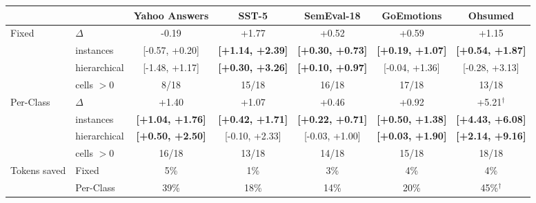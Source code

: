 \begin{tabular}{llccccc}
\toprule
 & & Yahoo Answers & SST-5 & SemEval-18 & GoEmotions & Ohsumed \\
\midrule
Fixed & $\Delta$ & -0.19 & +1.77 & +0.52 & +0.59 & +1.15 \\
 & instances & [-0.57, +0.20] & \textbf{[+1.14, +2.39]} & \textbf{[+0.30, +0.73]} & \textbf{[+0.19, +1.07]} & \textbf{[+0.54, +1.87]} \\
 & hierarchical & [-1.48, +1.17] & \textbf{[+0.30, +3.26]} & \textbf{[+0.10, +0.97]} & [-0.04, +1.36] & [-0.28, +3.13] \\
 & cells $>0$ & 8/18 & 15/18 & 16/18 & 17/18 & 13/18 \\
\midrule
Per-Class & $\Delta$ & +1.40 & +1.07 & +0.46 & +0.92 & +5.21$^{\dagger}$ \\
 & instances & \textbf{[+1.04, +1.76]} & \textbf{[+0.42, +1.71]} & \textbf{[+0.22, +0.71]} & \textbf{[+0.50, +1.38]} & \textbf{[+4.43, +6.08]} \\
 & hierarchical & \textbf{[+0.50, +2.50]} & [-0.10, +2.33] & [-0.03, +1.00] & \textbf{[+0.03, +1.90]} & \textbf{[+2.14, +9.16]} \\
 & cells $>0$ & 16/18 & 13/18 & 14/18 & 15/18 & 18/18 \\
\midrule
Tokens saved & Fixed & 5\% & 1\% & 3\% & 4\% & 4\% \\
 & Per-Class & 39\% & 18\% & 14\% & 20\% & 45\%$^{\dagger}$ \\
\bottomrule
\end{tabular}
